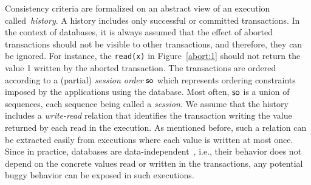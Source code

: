 Consistency criteria are formalized on an abstract view of an execution called~\emph{history}. A history includes only successful or committed transactions. In the context of databases, it is always assumed that the effect of aborted transactions should not be visible to other transactions, and therefore, they can be ignored. For instance, the \texttt{read(x)} in Figure~\ref{abort:1} should not return the value 1 written by the aborted transaction. The transactions are ordered according to a (partial) \emph{session order} $\mathsf{so}$ which represents ordering constraints imposed by the applications using the database. Most often, $\mathsf{so}$ is a union of sequences, each sequence being called a \emph{session}. We assume that the history includes a \emph{write-read} relation that identifies the transaction writing the value returned by each read in the execution. As mentioned before, such a relation can be extracted easily from executions where each value is written at most once. Since in practice, databases are data-independent~\cite{DBLP:conf/popl/Wolper86}, i.e., their behavior does not depend on the concrete values read or written in the transactions, any potential buggy behavior can be exposed in such executions. 



%



